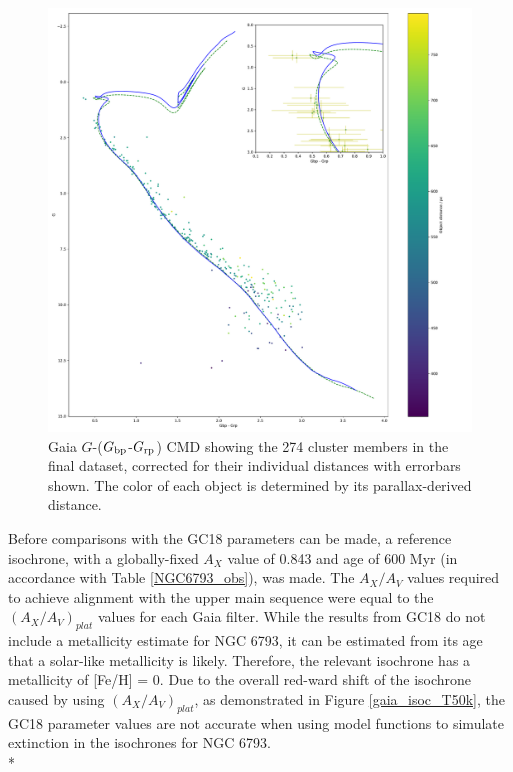 \documentclass[12pt, a4paper]{report}
\begin{document}
\begin{figure}[htb]
\begin{center}
\includegraphics[width=1.0\textwidth]{../NGC_6793_CMD_FeH_0p062_Av_1p1_500Myr_all_isochrones_summary.pdf}
\caption{Gaia $G$-($G_{\textnormal{bp}}$-$G_{\textnormal{rp}}$) CMD showing the 274 cluster members in the final dataset, corrected for their individual distances with errorbars shown. The color of each object is determined by its parallax-derived distance.}
\label{NGC_6793_isoc_inset_1.1_500_0.062}
\end{center}
\end{figure}

Before comparisons with the GC18 parameters can be made, a reference isochrone, with a globally-fixed $A_{X}$ value of 0.843 and age of 600 Myr (in accordance with Table \ref{NGC6793_obs}), was made. The $A_{X}/A_{V}$ values required to achieve alignment with the upper main sequence were equal to the $(A_{X}/A_{V})_{plat}$ values for each Gaia filter. While the results from GC18 do not include a metallicity estimate for NGC 6793, it can be estimated from its age that a solar-like metallicity is likely. Therefore, the relevant isochrone has a metallicity of [Fe/H] = 0. Due to the overall red-ward shift of the isochrone caused by using $(A_{X}/A_{V})_{plat}$, as demonstrated in Figure \ref{gaia_isoc_T50k}, the GC18 parameter values are not accurate when using model functions to simulate extinction in the isochrones for NGC 6793.\\*
\end{document}
